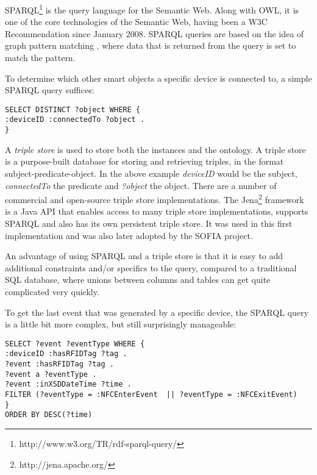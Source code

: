\ac{SPARQL}\footnote{http://www.w3.org/TR/rdf-sparql-query/} is the query language for the Semantic Web. Along with \ac{OWL}, it is one of the core technologies of the Semantic Web, having been a W3C Recommendation since January 2008. \ac{SPARQL} queries are based on the idea of graph pattern matching \cite{Sequeda2012}, where data that is returned from the query is set to match the pattern.

To determine which other smart objects a specific device is connected to, a simple \ac{SPARQL} query suffices:

\begin{verbatim}
SELECT DISTINCT ?object WHERE {
:deviceID :connectedTo ?object .
}
\end{verbatim}

\label{Jena}
A \emph{triple store} is used to store both the instances and the ontology. A triple store is a purpose-built database for storing and retrieving triples, in the format subject-predicate-object. In the above example \emph{deviceID} would be the subject, \emph{connectedTo} the predicate and \emph{?object} the object. There are a number of commercial and open-source triple store implementations. The Jena\footnote{http://jena.apache.org/} framework is a Java \ac{API} that enables access to many triple store implementations, supports \ac{SPARQL} and also has its own persistent triple store. It was used in this first implementation and was also later adopted by the \ac{SOFIA} project.

An advantage of using \ac{SPARQL} and a triple store is that it is easy to add additional constraints and/or specifics to the query, compared to a traditional \ac{SQL} database, where unions between columns and tables can get quite complicated very quickly.

To get the last event that was generated by a specific device, the \ac{SPARQL} query is a little bit more complex, but still surprisingly manageable:

\begin{verbatim}
SELECT ?event ?eventType WHERE { 
:deviceID :hasRFIDTag ?tag . 
?event :hasRFIDTag ?tag .
?event a ?eventType . 
?event :inXSDDateTime ?time . 
FILTER (?eventType = :NFCEnterEvent  || ?eventType = :NFCExitEvent) 
} 
ORDER BY DESC(?time) 
\end{verbatim}


